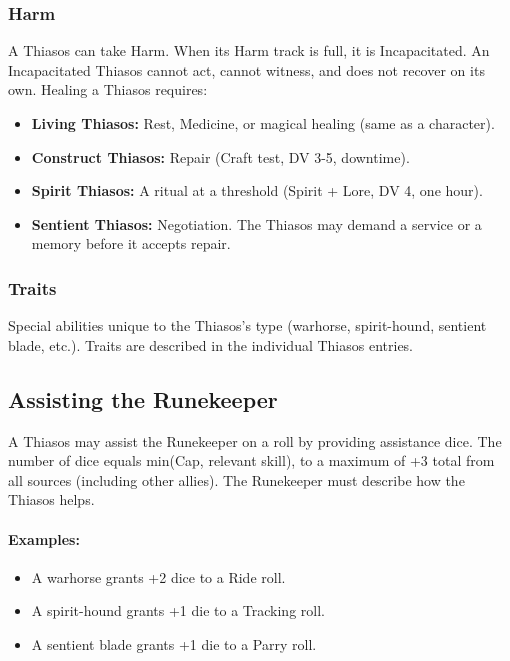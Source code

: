 \subsubsection{Harm}

A Thiasos can take Harm. When its Harm track is full, it is Incapacitated. An Incapacitated Thiasos cannot act, cannot witness, and does not recover on its own. Healing a Thiasos requires:

\begin{itemize}
\item \textbf{Living Thiasos:} Rest, Medicine, or magical healing (same as a character).
\item \textbf{Construct Thiasos:} Repair (Craft test, DV 3-5, downtime).
\item \textbf{Spirit Thiasos:} A ritual at a threshold (Spirit + Lore, DV 4, one hour).
\item \textbf{Sentient Thiasos:} Negotiation. The Thiasos may demand a service or a memory before it accepts repair.
\end{itemize}

\subsubsection{Traits}

Special abilities unique to the Thiasos's type (warhorse, spirit-hound, sentient blade, etc.). Traits are described in the individual Thiasos entries.

\subsection{Assisting the Runekeeper}

A Thiasos may assist the Runekeeper on a roll by providing assistance dice. The number of dice equals min(Cap, relevant skill), to a maximum of +3 total from all sources (including other allies). The Runekeeper must describe how the Thiasos helps.

\paragraph{Examples:}
\begin{itemize}
\item A warhorse grants +2 dice to a Ride roll.
\item A spirit-hound grants +1 die to a Tracking roll.
\item A sentient blade grants +1 die to a Parry roll.
\end{itemize}

